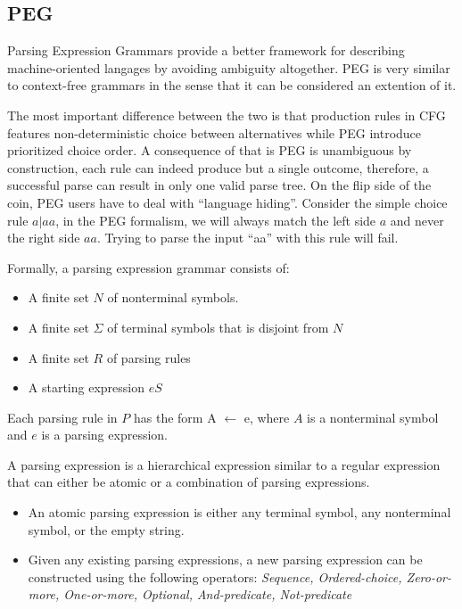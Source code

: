 		\subsection{PEG}

	Parsing Expression Grammars provide a better framework for describing machine-oriented langages by avoiding ambiguity altogether. PEG is very similar to context-free grammars in the sense that it can be considered an extention of it.

	The most important difference between the two is that production rules in CFG features non-deterministic choice between alternatives while PEG introduce prioritized choice order. A consequence of that is PEG is unambiguous by construction, each rule can indeed produce but a single outcome, therefore, a successful parse can result in only one valid parse tree. On the flip side of the coin, PEG users have to deal with ``language hiding''. Consider the simple choice rule $a|aa$, in the PEG formalism, we will always match the left side $a$ and never the right side $aa$. Trying to parse the input ``aa'' with this rule will fail. 

	\bigskip

	\begin{tcolorbox}
	Formally, a parsing expression grammar consists of: 
	\begin{itemize}
		\item A finite set $N$ of nonterminal symbols.
		\item A finite set $\Sigma$ of terminal symbols that is disjoint from $N$
		\item A finite set $R$ of parsing rules
		\item A starting expression $eS$
	\end{itemize}

	Each parsing rule in $P$ has the form A $\leftarrow$ e, where $A$ is a nonterminal symbol and $e$ is a parsing expression.

	A parsing expression is a hierarchical expression similar to a regular expression that can either be atomic or a combination of parsing expressions.

	\begin{itemize}
		\item An atomic parsing expression is either any terminal symbol, any nonterminal symbol, or the empty string.
		\item Given any existing parsing expressions, a new parsing expression can be constructed using the following operators: \textit{Sequence, Ordered-choice, Zero-or-more, One-or-more, Optional, And-predicate, Not-predicate}
	\end{itemize}
	\end{tcolorbox}

